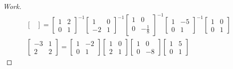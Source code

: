 \documentclass{article}
\begin{document}
\begin{enumerate}
{\begin{proof}[Work]
\begin{align*}
\begin{bmatrix}
                \end{bmatrix} =
                \begin{bmatrix}
                    1 & 2 \\
                    0 & 1
                \end{bmatrix}^{-1}
                \begin{bmatrix}
                    1  & 0 \\
                    -2 & 1
                \end{bmatrix}^{-1}
                \begin{bmatrix}
                    1 & 0            \\
                    0 & -\frac{1}{8}
                \end{bmatrix}^{-1}
                \begin{bmatrix}
                    1 & -5 \\
                    0 & 1
                \end{bmatrix}^{-1}
                \begin{bmatrix}
                    1 & 0 \\
                    0 & 1
                \end{bmatrix} \\
                \begin{bmatrix}
                    -3 & 1 \\
                    2  & 2
                \end{bmatrix} =
                \begin{bmatrix}
                    1 & -2 \\
                    0 & 1
                \end{bmatrix}
                \begin{bmatrix}
                    1 & 0 \\
                    2 & 1
                \end{bmatrix}
                \begin{bmatrix}
                    1 & 0  \\
                    0 & -8
                \end{bmatrix}
                \begin{bmatrix}
                    1 & 5 \\
                    0 & 1
                \end{bmatrix}
            \end{align*}

\end{proof}}
\end{enumerate}
\end{document}
